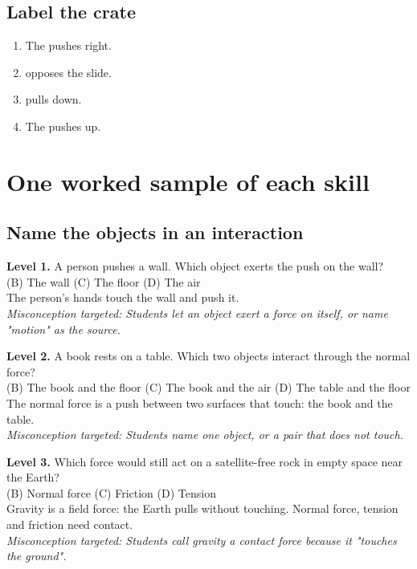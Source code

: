 \documentclass[11pt]{article}
\begin{document}
\subsection*{Label the crate}
\begin{enumerate}
\item The  pushes right.
\item {} opposes the slide.
\item {} pulls down.
\item The  pushes up.
\end{enumerate}
\section*{One worked sample of each skill}
\subsection*{Name the objects in an interaction}
\noindent\textbf{Level 1.} A person pushes a wall. Which object exerts the push on the wall?\\  \quad (B) The wall \quad (C) The floor \quad (D) The air\\  \quad The person's hands touch the wall and push it.\\ \textit{Misconception targeted: Students let an object exert a force on itself, or name "motion" as the source.}\par\medskip
\noindent\textbf{Level 2.} A book rests on a table. Which two objects interact through the normal force?\\  \quad (B) The book and the floor \quad (C) The book and the air \quad (D) The table and the floor\\  \quad The normal force is a push between two surfaces that touch: the book and the table.\\ \textit{Misconception targeted: Students name one object, or a pair that does not touch.}\par\medskip
\noindent\textbf{Level 3.} Which force would still act on a satellite-free rock in empty space near the Earth?\\  \quad (B) Normal force \quad (C) Friction \quad (D) Tension\\  \quad Gravity is a field force: the Earth pulls without touching. Normal force, tension and friction need contact.\\ \textit{Misconception targeted: Students call gravity a contact force because it "touches the ground".}\par\medskip
\end{document}
